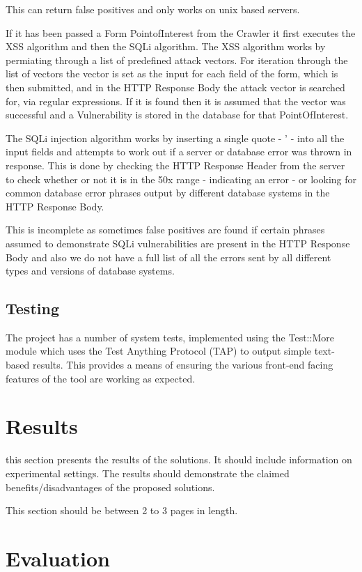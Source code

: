 \documentclass[12pt,a4paper]{article}
\begin{document}
This can return false positives and only works on unix based servers.

If it has been passed a Form PointofInterest from the Crawler it first executes the XSS algorithm and then the SQLi algorithm.  The XSS algorithm works by permiating through a list of predefined attack vectors. For iteration through the list of vectors the vector is set as the input for each field of the form, which is then submitted, and in the HTTP Response Body the attack vector is searched for, via regular expressions.  If it is found then it is assumed that the vector was successful and a Vulnerability is stored in the database for that PointOfInterest.

The SQLi injection algorithm works by inserting a single quote - ' - into all the input fields and attempts to work out if a server or database error was thrown in response.  This is done by checking the HTTP Response Header from the server to check whether or not it is in the 50x range - indicating an error - or looking for common database error phrases output by different database systems in the HTTP Response Body.  

This is incomplete as sometimes false positives are found if certain phrases assumed to demonstrate SQLi vulnerabilities are present in the HTTP Response Body and also we do not have a full list of all the errors sent by all different types and versions of database systems.

\subsection{Testing}
The project has a number of system tests, implemented using the Test::More module which uses the Test Anything Protocol (TAP) to output simple text-based results.  This provides a means of ensuring the various front-end facing features of the tool are working as expected.

\section{Results}

this section presents the results of the solutions.  It should include information on experimental settings.  The results should demonstrate the claimed benefits/disadvantages of the proposed solutions.

This section should be between 2 to 3 pages in length.

\section{Evaluation}
\end{document}

